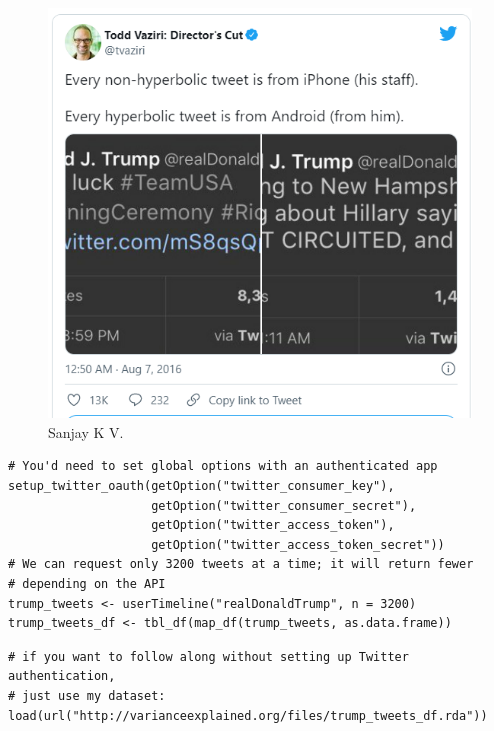 \documentclass[a4paper,12pt]{article}
\begin{document}
  \begin{figure}[h!]
  \includegraphics[width=\linewidth]{Tweet.png}
  \caption{Sanjay K V.}
  \label{fig:Tweet by Todd Vaziri}
\end{figure}



\begin{lstlisting}
# You'd need to set global options with an authenticated app
setup_twitter_oauth(getOption("twitter_consumer_key"),
                    getOption("twitter_consumer_secret"),
                    getOption("twitter_access_token"),
                    getOption("twitter_access_token_secret"))
# We can request only 3200 tweets at a time; it will return fewer
# depending on the API
trump_tweets <- userTimeline("realDonaldTrump", n = 3200)
trump_tweets_df <- tbl_df(map_df(trump_tweets, as.data.frame))
\end{lstlisting}


\begin{lstlisting}
# if you want to follow along without setting up Twitter authentication,
# just use my dataset:
load(url("http://varianceexplained.org/files/trump_tweets_df.rda"))
\end{lstlisting}
\printbibliography
\end{document}
